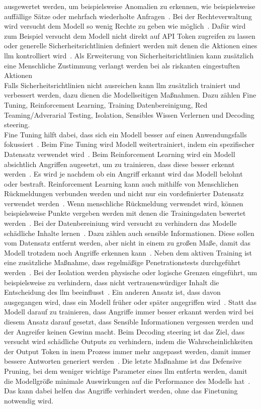 ausgewertet werden, um beispielsweise Anomalien zu erkennen, wie beispielsweise auffällige Sätze oder mehrfach wiederholte Anfragen~\cite[12]{sm10}. Bei der Rechteverwaltung
wird versucht dem Modell so wenig Rechte zu geben wie möglich~\cite{pi15}. Dafür wird zum Beispiel versucht dem Modell nicht direkt auf API Token zugreifen zu lassen oder
generelle Sicherheitsrichtlinien definiert werden mit denen die Aktionen eines \ac{llm} kontrolliert wird~\cite[8]{sm09}. Als Erweiterung von Sicherheitsrichtlinien kann 
zusätzlich eine Menschliche Zustimmung verlangt werden bei als riskanten eingestuften Aktionen~\cite{pi15} \\
Falls Sicherheitsrichtlinien nicht ausreichen kann \ac{llm} zusätzlich trainiert und verbessert werden, dazu dienen die Modellseitigen Maßnahmen. Dazu zählen Fine Tuning,
Reinforcement Learning, Training Datenbereinigung, Red Teaming/Adverarial Testing, Isolation, Sensibles Wissen Verlernen und Decoding steering. \\
Fine Tuning hilft dabei, dass sich ein Modell besser auf einen Anwendungsfalls fokussiert~\cite[7]{sm09}. Beim Fine Tuning wird Modell weitertrainiert, indem ein spezifischer
Datensatz verwendet wird~\cite{sm14}.
Beim Reinforcement Learning wird ein Modell absichtlich Angriffen augesetzt, um zu trainieren, dass diese besser erkennt werden~\cite{sm07}. Es wird je nachdem ob ein Angriff erkannt wird
das Modell belohnt oder bestraft. Reinforcement Learning kann auch mithilfe von Menschlichen Rückmeldungen verbunden werden und nicht nur ein vordefinierter Datensatz verwendet
werden~\cite{sm04}. Wenn menschliche Rückmeldung verwendet wird, können beispielsweise Punkte vergeben werden mit denen die Trainingsdaten bewertet werden~\cite[8]{sm10}.
Bei der Datenbereiniung wird versucht zu verhindern das Modelle schädliche Inhalte lernen~\cite{pi14}. Dazu zählen auch sensible Informationen. Diese sollen
vom Datensatz entfernt werden, aber nicht in einem zu großen Maße, damit das Modell trotzdem noch Angriffe erkennen kann~\cite[13]{sm10}. Neben dem aktiven Training ist eine 
zusätzliche Maßnahme, dass regelmäßige Penetrationstests durchgeführt werden~\cite[4]{sm08}\cite{pi15}. Bei der Isolation werden physische oder logische Grenzen eingeführt,
um beispielsweise zu verhindern, dass nicht vertrauenswürdiger Inhalt die Entscheidung des \ac{llm} beeinflusst~\cite[8]{sm09}. Ein anderen Ansatz ist, dass davon ausgegangen
wird, dass ein Modell früher oder später angegriffen wird~\cite[8]{sm10}. Statt das Modell darauf zu trainieren, dass Angriffe immer besser erkannt werden wird bei diesem 
Ansatz darauf gesetzt, dass Sensible Informationen vergessen werden und der Angreifer keinen Gewinn macht. Beim Decoding steering ist das Ziel, dass versucht wird schädliche
Outputs zu verhindern, indem die Wahrscheinlichkeiten der Output Token in inem Prozess immer mehr angepasst werden, damit immer bessere Antworten generiert werden~\cite[11]{sm10}.
Die letzte Maßnahme ist das Defensive Pruning, bei dem weniger wichtige Parameter eines \ac{llm} entfertn werden, damit die Modellgröße minimale Auswirkungen auf die 
Performance des Modells hat~\cite[11]{sm10}. Das kann dabei helfen das Angriffe verhindert werden, ohne das Finetuning notwendig wird. 


